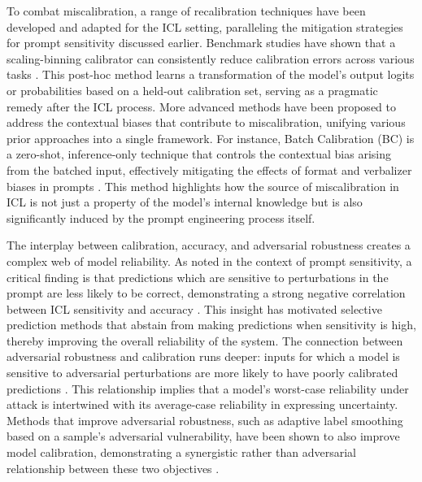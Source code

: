 \documentclass[11pt]{article}
\begin{document}
To combat miscalibration, a range of recalibration techniques have been developed and adapted for the ICL setting, paralleling the mitigation strategies for prompt sensitivity discussed earlier. Benchmark studies have shown that a scaling-binning calibrator can consistently reduce calibration errors across various tasks \cite{ref38}. This post-hoc method learns a transformation of the model's output logits or probabilities based on a held-out calibration set, serving as a pragmatic remedy after the ICL process. More advanced methods have been proposed to address the contextual biases that contribute to miscalibration, unifying various prior approaches into a single framework. For instance, Batch Calibration (BC) is a zero-shot, inference-only technique that controls the contextual bias arising from the batched input, effectively mitigating the effects of format and verbalizer biases in prompts \cite{ref178}. This method highlights how the source of miscalibration in ICL is not just a property of the model's internal knowledge but is also significantly induced by the prompt engineering process itself.

The interplay between calibration, accuracy, and adversarial robustness creates a complex web of model reliability. As noted in the context of prompt sensitivity, a critical finding is that predictions which are sensitive to perturbations in the prompt are less likely to be correct, demonstrating a strong negative correlation between ICL sensitivity and accuracy \cite{ref33}. This insight has motivated selective prediction methods that abstain from making predictions when sensitivity is high, thereby improving the overall reliability of the system. The connection between adversarial robustness and calibration runs deeper: inputs for which a model is sensitive to adversarial perturbations are more likely to have poorly calibrated predictions \cite{ref420}. This relationship implies that a model's worst-case reliability under attack is intertwined with its average-case reliability in expressing uncertainty. Methods that improve adversarial robustness, such as adaptive label smoothing based on a sample's adversarial vulnerability, have been shown to also improve model calibration, demonstrating a synergistic rather than adversarial relationship between these two objectives \cite{ref420}.
\end{document}

